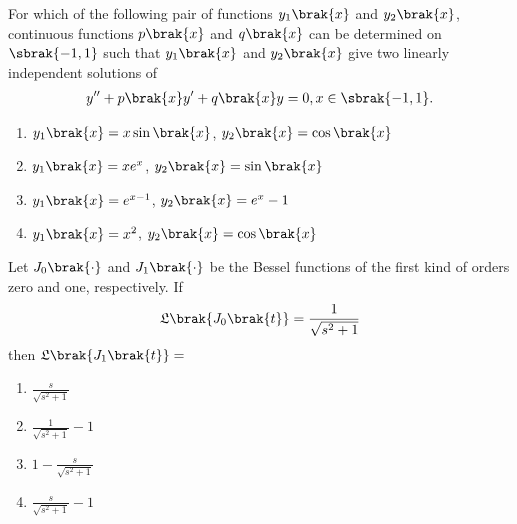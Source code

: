 \iffalse
    \author{EE24BTECH11061}
    \section{ma}
    \chapter{2007}
 \fi

\item For which of the following pair of functions $y_1\brak{x}$ and $y_2\brak{x}$, continuous functions $p\brak{x}$ and $q\brak{x}$ can be determined on $\sbrak{-1,1}$ such that $y_1\brak{x}$ and $y_2\brak{x}$ give two linearly independent solutions of 
\begin{align*}
    y^{{\prime}{\prime}} +  p\brak{x} y^{\prime} + q\brak{x} y = 0, x \in \sbrak{-1,1}.
\end{align*}
\begin{multicols}{2}
    \begin{enumerate}
        \item $y_1\brak{x} = x \sin{\brak{x}}$, $y_2\brak{x} = \cos{\brak{x}}$
        \item $y_1\brak{x} = x e^{x}$, $y_2\brak{x} = \sin{\brak{x}}$
        \item $y_1\brak{x} = e^{x-1}$, $y_2\brak{x} = e^{x}-1$
        \item $y_1\brak{x} = x^2$, $y_2\brak{x} = \cos{\brak{x}}$
    \end{enumerate}
\end{multicols}

\item Let $J_0\brak{\cdot}$ and $J_1\brak{\cdot}$ be the Bessel functions of the first kind of orders zero and one, respectively. If
\begin{align*}
    \mathfrak{L}\brak{J_0\brak{t}} = \frac{1}{\sqrt{s^2+1}}
\end{align*}
then $\mathfrak{L}\brak{J_1\brak{t}} = $
\begin{multicols}{2}
    \begin{enumerate}
        \item $\frac{s}{\sqrt{s^2+1}}$
        \item $\frac{1}{\sqrt{s^2+1}} - 1$
        \item $1- \frac{s}{\sqrt{s^2+1}}$
        \item $\frac{s}{\sqrt{s^2+1}} - 1$
    \end{enumerate}
\end{multicols}

